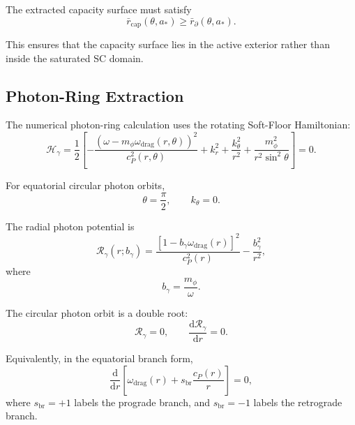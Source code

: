 The extracted capacity surface must satisfy
\begin{equation}
    \boxed{ \bar{r}_{\mathrm{cap}}(\theta,a_\ast) \geq \bar{r}_{\partial}(\theta,a_\ast). }
\end{equation}

This ensures that the capacity surface lies in the active exterior rather than inside the saturated SC domain.

\subsection{Photon-Ring Extraction}

The numerical photon-ring calculation uses the rotating Soft-Floor Hamiltonian:
\begin{equation}
    \mathcal{H}_{\gamma} = \frac{1}{2} \left[ - \frac{ \left( \omega - m_{\phi}\omega_{\mathrm{drag}}(r,\theta) \right)^2 }{ c_P^2(r,\theta) } + k_r^2 + \frac{k_{\theta}^2}{r^2} + \frac{m_{\phi}^2}{r^2\sin^2\theta} \right] = 0.
\end{equation}

For equatorial circular photon orbits,
\begin{equation}
    \theta = \frac{\pi}{2}, \qquad k_{\theta} = 0.
\end{equation}

The radial photon potential is
\begin{equation}
    \mathcal{R}_{\gamma}(r;b_{\gamma}) = \frac{ \left[ 1-b_{\gamma}\omega_{\mathrm{drag}}(r) \right]^2 }{ c_P^2(r) } - \frac{b_{\gamma}^2}{r^2},
\end{equation}
where
\begin{equation}
    b_{\gamma} = \frac{m_{\phi}}{\omega}.
\end{equation}

The circular photon orbit is a double root:
\begin{equation}
    \boxed{ \mathcal{R}_{\gamma} = 0, \qquad \frac{\mathrm{d}\mathcal{R}_{\gamma}}{\mathrm{d}r} = 0. }
\end{equation}

Equivalently, in the equatorial branch form,
\begin{equation}
    \boxed{ \frac{\mathrm{d}}{\mathrm{d}r} \left[ \omega_{\mathrm{drag}}(r) + s_{\mathrm{br}} \frac{c_P(r)}{r} \right] = 0, }
\end{equation}
where $s_{\mathrm{br}}=+1$ labels the prograde branch, and $s_{\mathrm{br}}=-1$ labels the retrograde branch.

